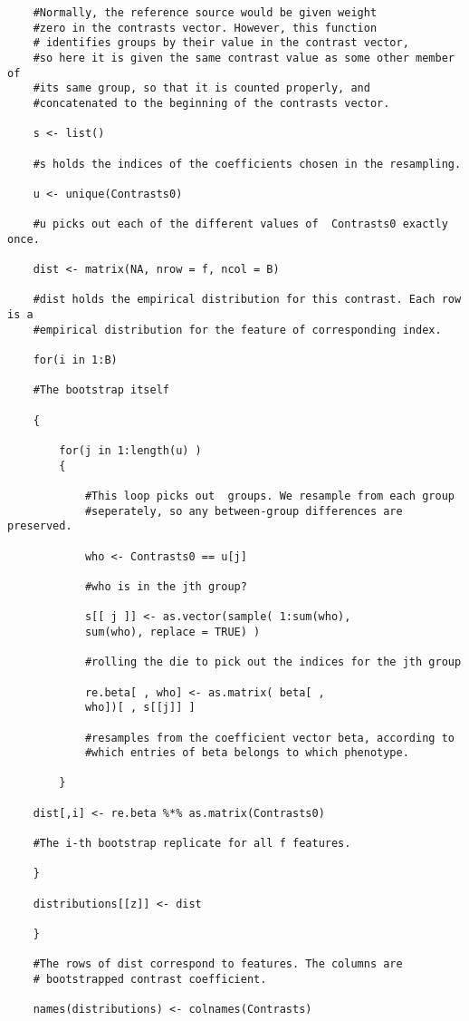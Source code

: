 \begin{verbatim}
	#Normally, the reference source would be given weight
	#zero in the contrasts vector. However, this function
	# identifies groups by their value in the contrast vector,
	#so here it is given the same contrast value as some other member of 
	#its same group, so that it is counted properly, and
	#concatenated to the beginning of the contrasts vector.
	
	s <- list() 

	#s holds the indices of the coefficients chosen in the resampling.

	u <- unique(Contrasts0)

	#u picks out each of the different values of  Contrasts0 exactly once.

	dist <- matrix(NA, nrow = f, ncol = B)

	#dist holds the empirical distribution for this contrast. Each row is a 
	#empirical distribution for the feature of corresponding index.
	
	for(i in 1:B)
	
	#The bootstrap itself
	
	{ 

		for(j in 1:length(u) )
		{ 
		
			#This loop picks out  groups. We resample from each group 
			#seperately, so any between-group differences are preserved.
			
			who <- Contrasts0 == u[j]
					
			#who is in the jth group?
					
			s[[ j ]] <- as.vector(sample( 1:sum(who),
			sum(who), replace = TRUE) )
				
			#rolling the die to pick out the indices for the jth group
			
			re.beta[ , who] <- as.matrix( beta[ , 
			who])[ , s[[j]] ] 

			#resamples from the coefficient vector beta, according to 
			#which entries of beta belongs to which phenotype.
			
		}
		
	dist[,i] <- re.beta %*% as.matrix(Contrasts0)
	
	#The i-th bootstrap replicate for all f features.
	
	}	
	
	distributions[[z]] <- dist
	
	}	
	
	#The rows of dist correspond to features. The columns are
	# bootstrapped contrast coefficient.
	
	names(distributions) <- colnames(Contrasts)
	

\end{verbatim}
